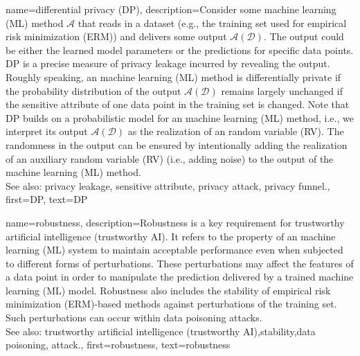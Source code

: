 {
{name={differential privacy (DP)},
  description={Consider some machine learning (ML) method $\mathcal{A}$ 
  	that reads in a dataset (e.g., the training set 
  	used for empirical risk minimization (ERM)) and delivers some output $\mathcal{A}(\mathcal{D})$. The output 
  	could be either the learned model parameters or the predictions for specific data points. 
  	DP is a precise measure of privacy leakage incurred by revealing the 
  	output. Roughly speaking, an machine learning (ML) method is differentially private if the probability distribution 
  	of the output $\mathcal{A}(\mathcal{D})$ remains largely unchanged if the sensitive attribute 
  	of one data point in the training set is changed. Note that DP 
  	builds on a probabilistic model for an machine learning (ML) method, i.e., we interpret its output $\mathcal{A}(\mathcal{D})$ 
  	as the realization of an random variable (RV). The randomness in the output can be ensured 
  	by intentionally adding the realization of an auxiliary random variable (RV) (i.e., adding noise) to 
  	the output of the machine learning (ML) method.
				\\ 
	See also: privacy leakage, sensitive attribute, privacy attack, privacy funnel.}, 
  first={DP}, 
  text={DP} 
}

{name={robustness},
	description={Robustness is a key requirement for trustworthy artificial intelligence (trustworthy AI). It
		refers to the property of an machine learning (ML) system to maintain acceptable performance even when 
		subjected to different forms of perturbations. These perturbations may affect the features 
		of a data point in order to manipulate the prediction delivered by a trained machine learning (ML) model. 
		Robustness also includes the stability of empirical risk minimization (ERM)-based methods against perturbations 
		of the training set. Such perturbations can occur within data poisoning attacks. 
		\\ 
		See also: trustworthy artificial intelligence (trustworthy AI),stability,data poisoning, attack.}, 
	first={robustness}, 
	text={robustness} 
}


}
